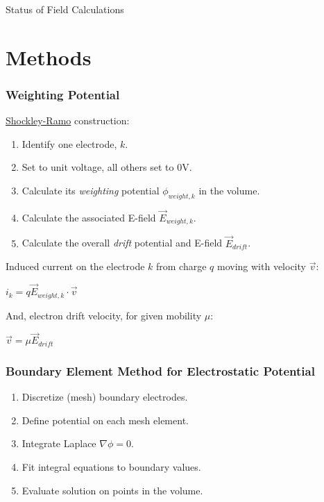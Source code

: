 \documentclass[xcolor=dvipsnames]{beamer}
\date{\today}
\begin{document}
\begin{frame}{Status of Field Calculations}
  \tableofcontents
\end{frame}

\section{Methods}

\begin{frame}[fragile]
  \frametitle{Weighting Potential}
  \href{https://en.wikipedia.org/wiki/Shockley%E2%80%93Ramo_theorem}{Shockley-Ramo} construction:
  \begin{enumerate}
  \item Identify one electrode, $k$.
  \item Set to unit voltage, all others set to 0V.
  \item Calculate its \textit{weighting} potential $\phi_{weight,k}$ in the volume.
  \item Calculate the associated E-field $\vec{E}_{weight,k}$.
  \item Calculate the overall \textit{drift} potential and E-field
    $\vec{E}_{drift}$.
  \end{enumerate}
  Induced current on the electrode $k$ from charge $q$ moving with velocity $\vec{v}$:
  \begin{center}
    $i_k = q \vec{E}_{weight,k} \cdot \vec{v}$
  \end{center}
  And, electron drift velocity, for given mobility $\mu$:
  \begin{center}
    $\vec{v} = \mu \vec{E}_{drift}$
  \end{center}

\end{frame}

\begin{frame}
  \frametitle{Boundary Element Method for Electrostatic Potential}

  \begin{enumerate}
  \item Discretize (mesh) boundary electrodes.
  \item Define potential on each mesh element.
  \item Integrate Laplace $\nabla\phi=0$.
  \item Fit integral equations to boundary values.
  \item Evaluate solution on points in the volume.
  \end{enumerate}

\end{frame}
\end{document}
